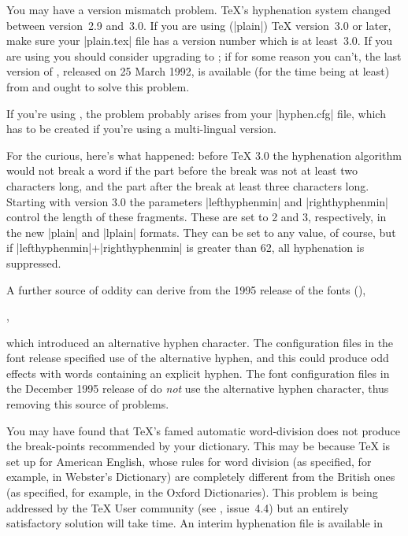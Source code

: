 \begin{changemargin}{-1cm}{-1cm}
You may have a version mismatch problem. \TeX{}'s hyphenation system changed
between version~2.9 and~3.0.  If you are using (|plain|) \TeX{}
version~3.0 or later, make sure your \File|plain.tex| file has a
version number which is at least~3.0.  If you are using \LaTeXo{} you
should consider upgrading to \LaTeXe{}; if for some reason you can't, the
last version of \LaTeXo{}, released on 25 March 1992, is available
(for the time being at least) from  and ought
to solve this problem.

If you're using \LaTeXe{}, the problem probably arises from your
|hyphen.cfg| file, which has to be created if you're using a
multi-lingual version.

For the curious, here's what happened:
before \TeX{} 3.0 the hyphenation algorithm would not
break a word if the part before the break was not at least two
characters long, and the part after the break at least three 
characters long. Starting with version 3.0 the parameters
\cs|lefthyphenmin| and \cs|righthyphenmin| control the length of these
fragments. These are set to 2 and 3, respectively, in the new
|plain| and |lplain| formats.  They can be set to any value, of course,
but if \cs|lefthyphenmin|+\cs|righthyphenmin| is greater than 62, all
hyphenation is suppressed.

A further source of oddity can derive from the 1995 release of the
\htmlignore
{} fonts (),
\endhtmlignore
\begin{htmlversion}
  ,
\end{htmlversion}
which introduced an alternative hyphen character.  The \LaTeXe{}
configuration files in the font release specified use of the
alternative hyphen, and this could produce odd effects with words
containing an explicit hyphen.  The font configuration files in the
December 1995 release of \LaTeXe{} do \emph{not} use the alternative
hyphen character, thus removing this source of problems.


You may have found that \TeX{}'s famed automatic word-division does
not produce the break-points recommended by your dictionary. This may be
because \TeX{} is set up for American English, whose rules for word
division (as specified, for example, in Webster's Dictionary) are
completely different from the British ones (as specified, for example,
in the Oxford Dictionaries). This problem is being addressed by the 
\TeX{} User community (see \BV{}, issue~4.4) but an entirely
satisfactory solution will take time.  An interim hyphenation file is
available in 


\end{changemargin}
